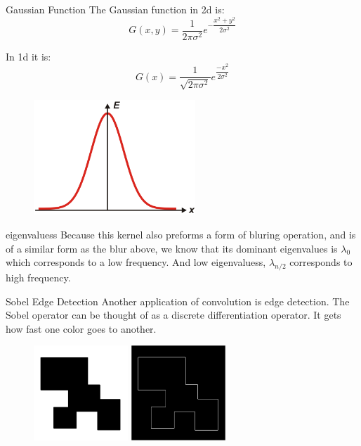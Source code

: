 \documentclass{beamer}
\begin{document}
\begin{frame}{Gaussian Function}
The Gaussian function in 2d is:
$$G(x,y) = \dfrac{1}{2\pi \sigma^2}e^{-\dfrac{x^2+y^2}{2 \sigma^2}}$$

In 1d it is:
$$ G(x) = \dfrac{1}{\sqrt{2\pi \sigma^2}}e^{\dfrac{-x^2}{2\sigma^2}}$$

\begin{figure}[ht]
\includegraphics[width=2.4in]{gauss.png}
\end{figure}
\end{frame}


\begin{frame} {eigenvaluess}
Because this kernel also preforms a form of bluring operation, and is of a similar form as the blur above, we know that its dominant eigenvalues is $\lambda_0$ which corresponds to a low frequency. And low eigenvaluess, $\lambda_{n/2}$ corresponds to high frequency.
\end{frame}


\begin{frame}{Sobel Edge Detection}
Another application of convolution is edge detection. The Sobel operator can be thought of as a discrete differentiation operator. It gets how fast one color goes to another. 

\begin{figure}[ht]
\includegraphics[width=1.4in]{edgein.png}
\hspace{.1in}
\includegraphics[width=1.4in]{edgeout.jpg}
\hspace{.1in}
\end{figure}
\end{frame}
\end{document}
